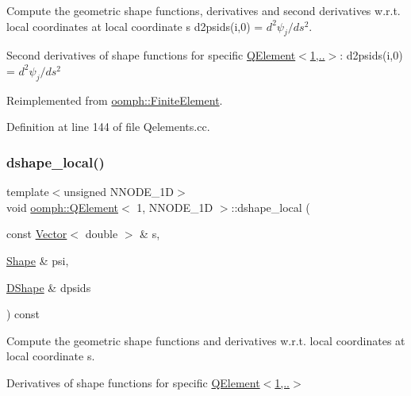 Compute the geometric shape functions, derivatives and second derivatives w.\+r.\+t. local coordinates at local coordinate s d2psids(i,0) = $ d^2 \psi_j / d s^2 $. 

Second derivatives of shape functions for specific \hyperlink{classoomph_1_1QElement_3_011_00_01NNODE__1D_01_4_a11fafdcbce81bce6c8420bb828afd448}{Q\+Element$<$1,..$>$}\+: d2psids(i,0) = $ d^2 \psi_j / d s^2 $ 

Reimplemented from \hyperlink{classoomph_1_1FiniteElement_a53e5051582d9da07b9d35da9debd0cd7}{oomph\+::\+Finite\+Element}.



Definition at line 144 of file Qelements.\+cc.

\mbox{\label{classoomph_1_1QElement_3_011_00_01NNODE__1D_01_4_afe9d639e0fc950e563eb39c6e3d0f9b1}} 
\subsubsection{\texorpdfstring{dshape\+\_\+local()}{dshape\_local()}}
{\footnotesize\ttfamily template$<$unsigned N\+N\+O\+D\+E\+\_\+1D$>$ \\
void \hyperlink{classoomph_1_1QElement}{oomph\+::\+Q\+Element}$<$ 1, N\+N\+O\+D\+E\+\_\+1D $>$\+::dshape\+\_\+local (\begin{DoxyParamCaption}\item[{const \hyperlink{classoomph_1_1Vector}{Vector}$<$ double $>$ \&}]{s,  }\item[{\hyperlink{classoomph_1_1Shape}{Shape} \&}]{psi,  }\item[{\hyperlink{classoomph_1_1DShape}{D\+Shape} \&}]{dpsids }\end{DoxyParamCaption}) const\hspace{0.3cm}{\ttfamily [virtual]}}



Compute the geometric shape functions and derivatives w.\+r.\+t. local coordinates at local coordinate s. 

Derivatives of shape functions for specific \hyperlink{classoomph_1_1QElement_3_011_00_01NNODE__1D_01_4_a11fafdcbce81bce6c8420bb828afd448}{Q\+Element$<$1,..$>$} 

